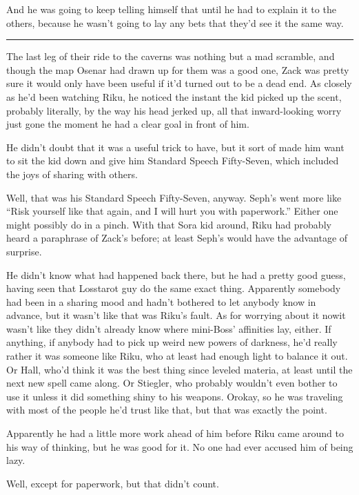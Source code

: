 And he was going to keep telling himself that until he had to explain it to the others, because he wasn't going to lay any bets that they'd see it the same way.

\fancybreak{\pfbreakdisplay}


The last leg of their ride to the caverns was nothing but a mad scramble, and though the map Osenar had drawn up for them was a good one, Zack was pretty sure it would only have been useful if it'd turned out to be a dead end. As closely as he'd been watching Riku, he noticed the instant the kid picked up the scent, probably literally, by the way his head jerked up, all that inward-looking worry just gone the moment he had a clear goal in front of him.

He didn't doubt that it was a useful trick to have, but it sort of made him want to sit the kid down and give him Standard Speech Fifty-Seven, which included the joys of sharing with others.

Well, that was his Standard Speech Fifty-Seven, anyway. Seph's went more like ``Risk yourself like that again, and I will hurt you with paperwork.'' Either one might possibly do in a pinch. With that Sora kid around, Riku had probably heard a paraphrase of Zack's before; at least Seph's would have the advantage of surprise.

He didn't know what had happened back there, but he had a pretty good guess, having seen that Losstarot guy do the same exact thing. Apparently somebody had been in a sharing mood and hadn't bothered to let anybody know in advance, but it wasn't like that was Riku's fault. As for worrying about it now\textemdash it wasn't like they didn't already know where mini-Boss' affinities lay, either. If anything, if anybody had to pick up weird new powers of darkness, he'd really rather it was someone like Riku, who at least had enough light to balance it out. Or Hall, who'd think it was the best thing since leveled materia, at least until the next new spell came along. Or Stiegler, who probably wouldn't even bother to use it unless it did something shiny to his weapons. Or\textemdash okay, so he was traveling with most of the people he'd trust like that, but that was exactly the point.

Apparently he had a little more work ahead of him before Riku came around to his way of thinking, but he was good for it. No one had ever accused him of being lazy.

Well, except for paperwork, but that didn't count.


